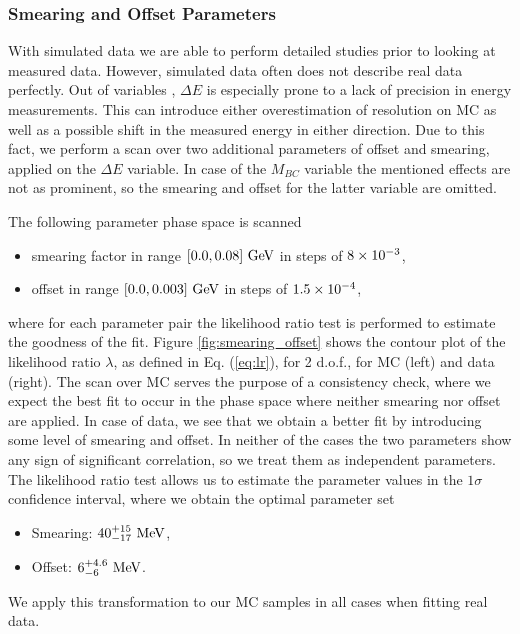 \subsubsection{Smearing and Offset Parameters}
With simulated data we are able to perform detailed studies prior to looking at measured data. However, simulated data often does not describe real data perfectly. Out of variables \vars, $\Delta E$ is especially prone to a lack of precision in energy measurements. This can introduce either overestimation of resolution on MC as well as a possible shift in the measured energy in either direction. Due to this fact, we perform a scan over two additional parameters of offset and smearing, applied on the $\Delta E$ variable. In case of the $M_{BC}$ variable the mentioned effects are not as prominent, so the smearing and offset for the latter variable are omitted. 

The following parameter phase space is scanned
\begin{itemize}
\item smearing factor in range $[0.0,0.08]\mathrm{~GeV}$ in steps of $8\times 10^{-3}$,
\item offset in range $[0.0,0.003]\mathrm{~GeV}$ in steps of $1.5\times 10^{-4}$,
\end{itemize}
where for each parameter pair the likelihood ratio test is performed to estimate the goodness of the fit. Figure \ref{fig:smearing_offset} shows the contour plot of the likelihood ratio $\lambda$, as defined in Eq. (\ref{eq:lr}), for 2 d.o.f., for MC (left) and data (right). The scan over MC serves the purpose of a consistency check, where we expect the best fit to occur in the phase space where neither smearing nor offset are applied. In case of data, we see that we obtain a better fit by introducing some level of smearing and offset. In neither of the cases the two parameters show any sign of significant correlation, so we treat them as independent parameters. The likelihood ratio test allows us to estimate the parameter values in the $1\sigma$ confidence interval, where we obtain the optimal parameter set
\begin{itemize}
\item Smearing: $40_{-17}^{+15}\mathrm{~MeV}$,
\item Offset: $6_{-6}^{+4.6}\mathrm{~MeV}$.
\end{itemize}
We apply this transformation to our MC samples in all cases when fitting real data.


